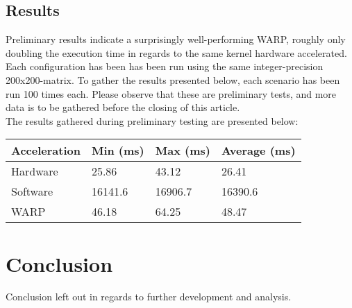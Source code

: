 \documentclass[fleqn,10pt]{SelfArx} %
\begin{document}
\subsection{Results}
\label{sec:contribution:results}
Preliminary results indicate a surprisingly well-performing WARP, roughly only doubling the execution time in regards to the same kernel hardware accelerated. Each configuration has been has been run using the same integer-precision 200x200-matrix. To gather the results presented below, each scenario has been run 100 times each. Please observe that these are preliminary tests, and more data is to be gathered before the closing of this article. \\
The results gathered during preliminary testing are presented below:
\begin{center}
	\begin{tabular}{| l | l | l | l |}
	\hline
	Acceleration & Min (ms) & Max (ms) & Average (ms)	\\ \hline
	Hardware & 25.86  & 43.12  & 26.41			\\ \hline
	Software & 16141.6 & 16906.7 & 16390.6		\\ \hline
	WARP & 46.18 & 64.25 & 48.47				\\
	\hline
	\end{tabular}
\end{center}



\section{Conclusion}
\label{sec:conclusion}
Conclusion left out in regards to further development and analysis.
\end{document}
